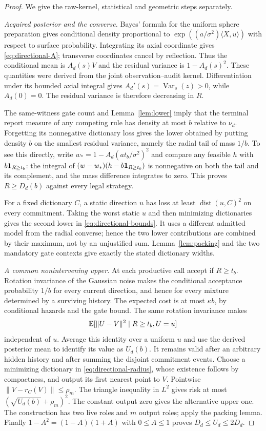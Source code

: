\begin{proof}
We give the raw-kernel, statistical and geometric steps separately.

\emph{Acquired posterior and the converse.}
Bayes' formula for the uniform sphere preparation gives conditional density proportional to $\exp((a/\sigma^2)\langle X,u\rangle)$ with respect to surface probability. Integrating its axial coordinate gives \eqref{eq:directional-A}; transverse coordinates cancel by reflection. Thus the conditional mean is $A_d(s)V$ and the residual variance is $1-A_d(s)^2$. These quantities were derived from the joint observation--audit kernel. Differentiation under its bounded axial integral gives $A_d'(s)=\operatorname{Var}_s(z)>0$, while $A_d(0)=0$. The residual variance is therefore decreasing in $R$.

The same-witness gate count and Lemma~\ref{lem:lower} imply that the terminal report measure of any competing rule has density at most $b$ relative to $\nu_d$. Forgetting its nonnegative dictionary loss gives the lower obtained by putting density $b$ on the smallest residual variance, namely the radial tail of mass $1/b$. To see this directly, write $w_*=1-A_d(at_b/\sigma^2)^2$ and compare any feasible $h$ with $b\mathbf1_{R\ge t_b}$: the integral of $(w-w_*)(h-b\mathbf1_{R\ge t_b})$ is nonnegative on both the tail and its complement, and the mass difference integrates to zero. This proves $R\ge D_d(b)$ against every legal strategy.

For a fixed dictionary $C$, a static direction $u$ has loss at least $\operatorname{dist}(u,C)^2$ on every commitment. Taking the worst static $u$ and then minimizing dictionaries gives the second lower in \eqref{eq:directional-bounds}. It uses a different admitted model from the radial converse; hence the two lower contributions are combined by their maximum, not by an unjustified sum. Lemma~\ref{lem:packing} and the two mandatory gate contexts give exactly the stated dictionary widths.

\emph{A common nonintervening upper.}
At each productive call accept if $R\ge t_b$. Rotation invariance of the Gaussian noise makes the conditional acceptance probability $1/b$ for every current direction, and hence for every mixture determined by a surviving history. The expected cost is at most $\kappa b$, by conditional hazards and the gate bound. The same rotation invariance makes
\[
 \mathbb E[\|U-V\|^2\mid R\ge t_b,U=u]
\]
independent of $u$. Average this identity over a uniform $u$ and use the derived posterior mean to identify its value as $U_d(b)$. It remains valid after an arbitrary hidden history and after summing the disjoint commitment events. Choose a minimizing dictionary in \eqref{eq:directional-radius}, whose existence follows by compactness, and output its first nearest point to $V$. Pointwise $\|V-r_C(V)\|\le\rho_m$. The triangle inequality in $L^2$ gives risk at most $(\sqrt{U_d(b)}+\rho_m)^2$. The constant output zero gives the alternative upper one. The construction has two live roles and $m$ output roles; apply the packing lemma. Finally $1-A^2=(1-A)(1+A)$ with $0\le A\le1$ proves $D_d\le U_d\le2D_d$.


\end{proof}
